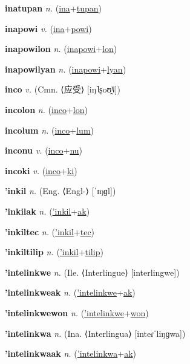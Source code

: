 \textbf{\hypertarget{inatupan}{inatupan}} \textit{n.} (\hyperlink{ina}{ina}+\allowbreak \hyperlink{tupan}{tupan})


\textbf{\hypertarget{inapowi}{inapowi}} \textit{v.} (\hyperlink{ina}{ina}+\allowbreak \hyperlink{powi}{powi})


\textbf{\hypertarget{inapowilon}{inapowilon}} \textit{n.} (\hyperlink{inapowi}{inapowi}+\allowbreak \hyperlink{lon}{lon})


\textbf{\hypertarget{inapowilyan}{inapowilyan}} \textit{n.} (\hyperlink{inapowi}{inapowi}+\allowbreak \hyperlink{lyan}{lyan})


\textbf{\hypertarget{inco}{inco}} \textit{v.} (Cmn. ⟨{\chinese{}应受}⟩ [iŋ˥ʂoʊ̯˥˩])


\textbf{\hypertarget{incolon}{incolon}} \textit{n.} (\hyperlink{inco}{inco}+\allowbreak \hyperlink{lon}{lon})


\textbf{\hypertarget{incolum}{incolum}} \textit{n.} (\hyperlink{inco}{inco}+\allowbreak \hyperlink{lum}{lum})


\textbf{\hypertarget{inconu}{inconu}} \textit{v.} (\hyperlink{inco}{inco}+\allowbreak \hyperlink{nu}{nu})


\textbf{\hypertarget{incoki}{incoki}} \textit{v.} (\hyperlink{inco}{inco}+\allowbreak \hyperlink{ki}{ki})


\textbf{\hypertarget{'inkil}{'inkil}} \textit{n.} (Eng. ⟨Engl-⟩ [ˈɪŋɡl])


\textbf{\hypertarget{'inkilak}{'inkilak}} \textit{n.} (\hyperlink{'inkil}{'inkil}+\allowbreak \hyperlink{ak}{ak})


\textbf{\hypertarget{'inkiltec}{'inkiltec}} \textit{n.} (\hyperlink{'inkil}{'inkil}+\allowbreak \hyperlink{tec}{tec})


\textbf{\hypertarget{'inkiltilip}{'inkiltilip}} \textit{n.} (\hyperlink{'inkil}{'inkil}+\allowbreak \hyperlink{tilip}{tilip})


\textbf{\hypertarget{'intelinkwe}{'intelinkwe}} \textit{n.} (Ile. ⟨Interlingue⟩ [interlingwe])


\textbf{\hypertarget{'intelinkweak}{'intelinkweak}} \textit{n.} (\hyperlink{'intelinkwe}{'intelinkwe}+\allowbreak \hyperlink{ak}{ak})


\textbf{\hypertarget{'intelinkwewon}{'intelinkwewon}} \textit{n.} (\hyperlink{'intelinkwe}{'intelinkwe}+\allowbreak \hyperlink{won}{won})


\textbf{\hypertarget{'intelinkwa}{'intelinkwa}} \textit{n.} (Ina. ⟨Interlingua⟩ [inteɾˈliŋɡwa])


\textbf{\hypertarget{'intelinkwaak}{'intelinkwaak}} \textit{n.} (\hyperlink{'intelinkwa}{'intelinkwa}+\allowbreak \hyperlink{ak}{ak})


